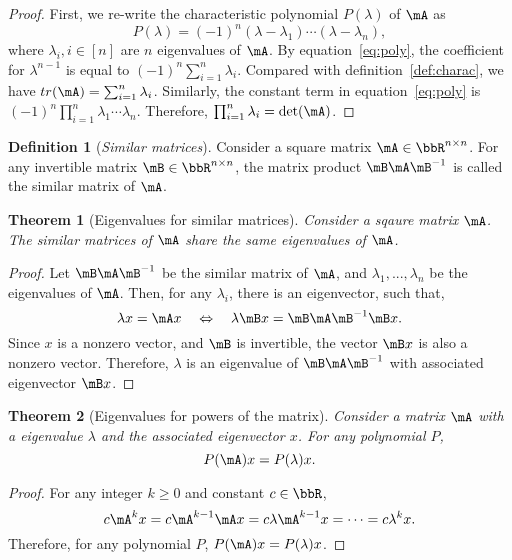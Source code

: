 \documentclass[11pt]{article}
\theoremstyle{plain}
\newtheorem{thm}{Theorem}[section]
\theoremstyle{definition}
\newtheorem{defn}{Definition}
\begin{document}
\begin{proof}
	First, we re-write the characteristic polynomial $P(\lambda)$ of $\mA$ as
	\begin{equation}\label{eq:poly}
		P(\lambda) = (-1)^n (\lambda - \lambda_1)\cdots (\lambda - \lambda_n), 
	\end{equation}   
	where $\lambda_i, i \in [n]$ are $n$ eigenvalues of $\mA$. By equation~\eqref{eq:poly}, the coefficient for $\lambda^{n-1}$ is equal to $(-1)^n\sum_{i=1}^n \lambda_i$. Compared with definition~\ref{def:charac}, we have $tr(\mA) = \sum_{i=1}^n \lambda_i$. Similarly, the constant term in equation~\eqref{eq:poly} is $(-1)^n \prod_{i=1}^n \lambda_1 \cdots \lambda_n $. Therefore, $\prod_{i=1}^n \lambda_i = \det(\mA)$.
\end{proof}

\begin{defn}[\textit{Similar matrices}]\label{def:similar}
	Consider a square matrix $\mA \in \bbR^{n \times n}$. For any invertible matrix $\mB \in \bbR^{n \times n}$, the matrix product $\mB \mA \mB^{-1}$ is called the similar matrix of $\mA$.
\end{defn}

\begin{thm}[Eigenvalues for similar matrices]\label{thm:similar}
	Consider a sqaure matrix $\mA$. The similar matrices of $\mA$ share the same eigenvalues of $\mA$.
\end{thm}
\begin{proof}
	Let $\mB \mA \mB^{-1}$ be the similar matrix of $\mA$, and $\lambda_1,...,\lambda_n$ be the eigenvalues of $\mA$. Then, for any $\lambda_i$, there is an eigenvector, such that, 
	\[ \lambda x = \mA x \quad \Leftrightarrow \quad \lambda \mB x = \mB \mA \mB^{-1} \mB x.\]
	Since $x$ is a nonzero vector, and $\mB$ is invertible, the vector $\mB x$ is also a nonzero vector. Therefore, $\lambda$ is an eigenvalue of $\mB \mA \mB^{-1}$ with associated eigenvector $\mB x$.
\end{proof}

\begin{thm}[Eigenvalues for powers of the matrix]
	Consider a matrix $\mA$ with a eigenvalue $\lambda$ and the associated eigenvector $x$. For any polynomial $P$, 
	\[ P(\mA) x = P(\lambda) x. \]
\end{thm}
\begin{proof}
	For any integer $k \geq 0$ and constant $c \in \bbR$,
	\[ c\mA^k x = c\mA^{k-1} \mA x= c\lambda \mA^{k-1} x = \cdots = c\lambda^k x.\]
	Therefore, for any polynomial $P$, $P(\mA)x = P(\lambda)x$.
\end{proof}
\end{document}
